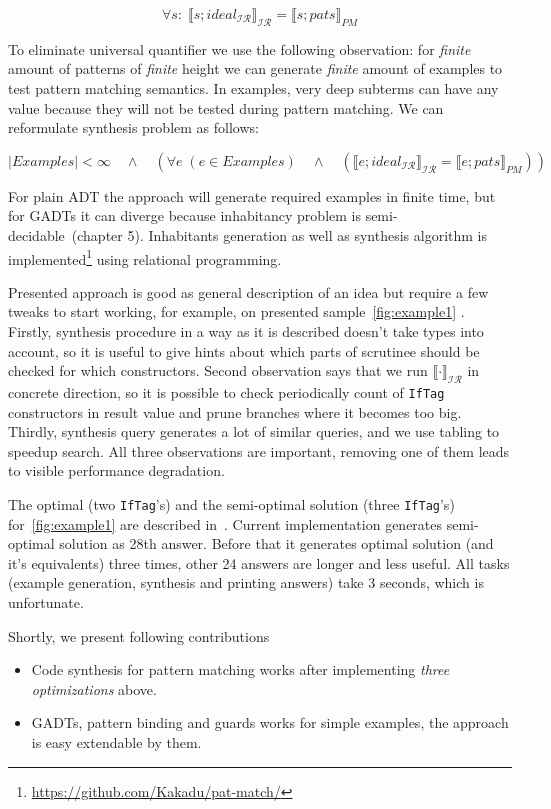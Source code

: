 \documentclass[submission,copyright,creativecommons]{eptcs}
\newcommand{\sem}[1]{\llbracket #1 \rrbracket}
\newcommand{\ir}{\ensuremath{\mathcal{I\!R}}}
\begin{document}
$$
\forall s:\; \sem{s; ideal_\ir}_\ir = \sem{s;pats}_{PM}
$$

To eliminate universal quantifier we use the following observation: for \emph{finite} amount of patterns of \emph{finite} height we can generate \emph{finite} amount of examples to test pattern matching semantics. In examples, very deep subterms can have any value because they will not be tested during pattern matching. We can reformulate synthesis problem as follows:

$$
\mid  Examples\mid < \infty\quad \land\quad \left(\forall e \; (e\in Examples)\quad\land \quad\left( \sem{e; ideal_\ir}_\ir = \sem{e;pats}_{PM}\right)\right)
$$

For plain ADT the approach will generate required examples in finite time, but for GADTs it can diverge because inhabitancy problem is semi-decidable~\cite{garrigue2017gadts}(chapter 5). Inhabitants generation as well as synthesis algorithm is implemented\footnote{\url{https://github.com/Kakadu/pat-match/}} using relational programming.

Presented approach is good as general description of an idea but require a few tweaks to start working, for example, on presented sample~\ref{fig:example1} . Firstly, synthesis procedure in a way as it is described doesn't take types into account, so it is useful to give hints about which parts of scrutinee should be checked for which constructors. Second observation says that we run $\sem{\cdot}_\ir$ in concrete direction, so it is possible to check periodically count of \texttt{IfTag} constructors in result value and prune branches where it becomes too big. Thirdly, synthesis query generates a lot of similar queries, and we use tabling to speedup search. All three observations are important, removing one of them leads to visible performance degradation.

The optimal (two \texttt{IfTag}'s) and the semi-optimal solution (three \texttt{IfTag}'s) for~\ref{fig:example1} are described in~\cite{maranget2008}. Current implementation generates semi-optimal solution as 28th answer. Before that it generates optimal solution (and it's equivalents) three times, other 24 answers are longer and less useful. All tasks (example generation, synthesis and printing answers) take 3 seconds, which is unfortunate.

Shortly, we present following contributions
\begin{itemize}
\item Code synthesis for pattern matching works after implementing \emph{three optimizations} above.
\item GADTs, pattern binding and guards works for simple examples, the approach is easy extendable by them.
\end{itemize}
\end{document}
